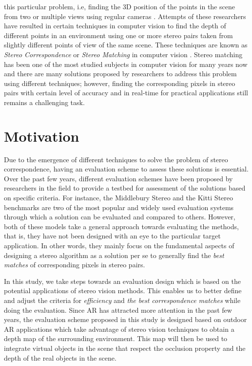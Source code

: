 this particular problem, i.e, finding the 3D position of the points in the scene from two or multiple views using regular cameras \cite{sze11}. Attempts of these researchers have resulted in
certain techniques in computer vision to find the depth of different points in an environment using one or more stereo pairs taken from slightly different points of view of the same scene.
These techniques are known as {\it Stereo Correspondence} or {\it Stereo Matching} in computer vision \cite{sze11}. Stereo matching has been one of the most studied subjects in computer vision for 
many years now and there are many solutions proposed by researchers to address this problem using different techniques; however, finding the corresponding pixels in stereo pairs with certain level of 
accuracy and in real-time for practical applications still remains a challenging task. {\newline}

\section {Motivation}

Due to the emergence of different techniques to solve the problem of stereo correspondence, having an evaluation scheme to assess 
these solutions is essential. Over the past few years, different evaluation schemes have been proposed 
by researchers in the field to provide a testbed for assessment of the solutions based on specific criteria.
For instance, the Middlebury Stereo \cite{mideval} and the Kitti Stereo benchmarks \cite{kitti}
are two of the most popular and widely used evaluation systems through which a solution can be evaluated and compared 
to others. 
However, both of these models take a general approach towards evaluating the methods, that is, they 
have not been designed with an eye to the particular target application. In other words, 
they mainly focus on the fundamental aspects of designing a stereo algorithm as a solution per se to generally
find the \textit{best matches} of corresponding pixels in stereo pairs. 

In this study, we take steps towards an evaluation design which is based on the potential 
applications of stereo vision methods.
This enables us to better define and adjust the criteria for \textit{efficiency} and 
\textit{the best correspondence matches} while doing the evaluation.
Since AR has attracted more attention in the past few years, 
the evaluation scheme proposed in this study is designed based on outdoor AR applications which take advantage of
stereo vision techniques to obtain a depth map of the surrounding environment. This map will then be used to
integrate virtual objects in the scene that respect the occlusion property and the depth of the real objects in the scene. 

